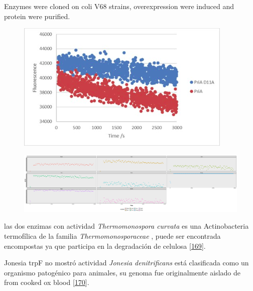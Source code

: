 \documentclass[12pt,twoside]{reedthesis}
\begin{document}
  Enzymes were cloned on coli V68 strains, overexpression were induced and
  protein were purified.
  
  \begin{figure}[h!tbp]
  \centering
  \includegraphics[angle = 0,scale = 0.8]{chapter4/MutantControl.png}
  \caption[Scoe and non functional Scoe PriA acting on dGTP]{\footnotesize{}}
  \label{fig:PriARutas2}
  \end{figure}
  
  \begin{figure}[h!tbp]
  \centering
  \includegraphics[angle = 0,scale = 0.6]{chapter4/GTPCinetica.pdf}
  \caption[Scoe and non functional Scoe PriA acting on dGTP]{\footnotesize{}}
  \label{fig:PriARutas2}
  \end{figure}
  
  \clearpage  
  
  las dos enzimas con actividad \emph{Thermomonospora curvata} es una
  Actinobacteria termofílica de la familia \emph{Thermomonosporaceae} ,
  puede ser encontrada encompostas ya que participa en la degradación de
  celulosa {[}\protect\hyperlink{ref-chertkov_complete_2011}{169}{]}.
  
  Jonesia trpF no mostró actividad \emph{Jonesia denitrificans} está
  clasificada como un organismo patogénico para animales, su genoma fue
  originalmente aislado de from cooked ox blood
  {[}\protect\hyperlink{ref-pukall_complete_2009}{170}{]}.
  
  \begin{Shaded}
  \begin{Highlighting}[]
  \StringTok{ }\NormalTok{(}\NormalTok{, }\NormalTok{, }\NormalTok{)}
         \CharTok{\textbackslash{}\textbackslash{}}\NormalTok{,}
         \NormalTok{)}
  \end{Highlighting}
  \end{Shaded}
  
\end{document}
